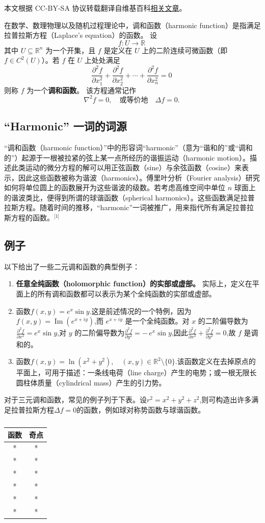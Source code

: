 
本文根据 CC-BY-SA 协议转载翻译自维基百科\href{https://en.wikipedia.org/wiki/Harmonic_function}{相关文章}。


在数学、数理物理以及随机过程理论中，调和函数（harmonic function）是指满足拉普拉斯方程（Laplace's equation）的函数。  
设
\[
f : U \to \mathbb{R}~
\]
其中 \(U \subseteq \mathbb{R}^n\) 为一个开集，且 \(f\) 是定义在 \(U\) 上的二阶连续可微函数（即 \(f \in C^2(U)\)）。若 \(f\) 在 \(U\) 上处处满足
\[
\frac{\partial^2 f}{\partial x_1^2}
+ \frac{\partial^2 f}{\partial x_2^2}
+ \cdots
+ \frac{\partial^2 f}{\partial x_n^2}
= 0~
\]
则称 \(f\) 为一个\textbf{调和函数}。  
该方程通常记作
\[
\nabla^2 f = 0,
\quad \text{或等价地} \quad
\Delta f = 0.~
\]
\subsection{“Harmonic” 一词的词源}
“调和函数（harmonic function）”中的形容词“harmonic”（意为“谐和的”或“调和的”）起源于一根被拉紧的弦上某一点所经历的谐振运动（harmonic motion）。描述此类运动的微分方程的解可以用正弦函数（sine）与余弦函数（cosine）来表示，因此这些函数被称为谐波（harmonics）。傅里叶分析（Fourier analysis）研究如何将单位圆上的函数展开为这些谐波的级数。若考虑高维空间中单位 \(n\) 球面上的谐波类比，便得到所谓的球谐函数（spherical harmonics）。这些函数满足拉普拉斯方程。随着时间的推移，“harmonic”一词被推广，用来指代所有满足拉普拉斯方程的函数。\(^\text{[1]}\)  
\subsection{例子}
以下给出了一些二元调和函数的典型例子：
\begin{enumerate}
  \item \textbf{任意全纯函数（holomorphic function）的实部或虚部。}  
  实际上，定义在平面上的所有调和函数都可以表示为某个全纯函数的实部或虚部。
  \item 函数$f(x, y) = e^{x} \sin y$.这是前述情况的一个特例，因为$f(x, y) = \operatorname{Im}\!\left(e^{x + i y}\right)$,而 \( e^{x + i y} \) 是一个全纯函数。对 \(x\) 的二阶偏导数为$\frac{\partial^2 f}{\partial x^2} = e^{x} \sin y$,对 \(y\) 的二阶偏导数为$\frac{\partial^2 f}{\partial y^2} = -\, e^{x} \sin y$,因此$\frac{\partial^2 f}{\partial x^2} + \frac{\partial^2 f}{\partial y^2} = 0$,故 \(f\) 是调和的。
  \item 函数$f(x, y) = \ln\!\left(x^2 + y^2\right),\quad (x, y) \in \mathbb{R}^2 \setminus \{0\}$.该函数定义在去掉原点的平面上，可用于描述：一条线电荷（line charge）产生的电势；或一根无限长圆柱体质量（cylindrical mass）产生的引力势。
\end{enumerate}
对于三元调和函数，常见的例子列于下表。设$r^2 = x^2 + y^2 + z^2$,则可构造出许多满足拉普拉斯方程$\Delta f = 0$的函数，例如球对称势函数与球谐函数。

\begin{table}[ht]
\centering
\caption{}\label{tab_THhs1}
\begin{tabular}{|c|c|}
\hline
\textbf{函数}&\textbf{奇点}\\
\hline
* & * \\
\hline
* & * \\
\hline
* & * \\
\hline
* & * \\
\hline
* & * \\
\hline
* & * \\
\hline
\end{tabular}
\end{table}